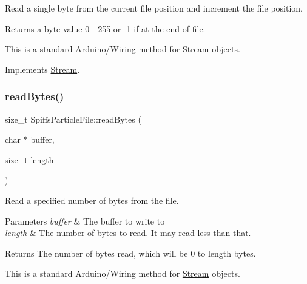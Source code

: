 Read a single byte from the current file position and increment the file position. 

\begin{DoxyReturn}{Returns}
a byte value 0 -\/ 255 or -\/1 if at the end of file.
\end{DoxyReturn}
This is a standard Arduino/\+Wiring method for \mbox{\hyperlink{class_stream}{Stream}} objects. 

Implements \mbox{\hyperlink{class_stream_aea5dee9fcb038148515b7c9212d38dc0}{Stream}}.

\mbox{\label{class_spiffs_particle_file_a389c6c38e856bb76ac7c0194d7b63ff8}} 
\subsubsection{\texorpdfstring{read\+Bytes()}{readBytes()}}
{\footnotesize\ttfamily size\+\_\+t Spiffs\+Particle\+File\+::read\+Bytes (\begin{DoxyParamCaption}\item[{char $\ast$}]{buffer,  }\item[{size\+\_\+t}]{length }\end{DoxyParamCaption})\hspace{0.3cm}{\ttfamily [virtual]}}



Read a specified number of bytes from the file. 


\begin{DoxyParams}{Parameters}
{\em buffer} & The buffer to write to\\
\hline
{\em length} & The number of bytes to read. It may read less than that.\\
\hline
\end{DoxyParams}
\begin{DoxyReturn}{Returns}
The number of bytes read, which will be 0 to length bytes.
\end{DoxyReturn}
This is a standard Arduino/\+Wiring method for \mbox{\hyperlink{class_stream}{Stream}} objects. \mbox{\label{class_spiffs_particle_file_a0a5b83d74718f890d0e449fb7c3bf818}} 
